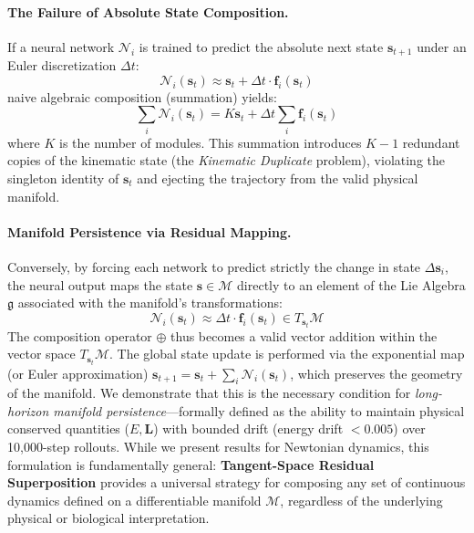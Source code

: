 \documentclass[twoside,11pt]{article}
\begin{document}
\paragraph{The Failure of Absolute State Composition.}
If a neural network $\mathcal{N}_i$ is trained to predict the absolute next state $\mathbf{s}_{t+1}$ under an Euler discretization $\Delta t$:
\begin{equation}
    \mathcal{N}_i(\mathbf{s}_t) \approx \mathbf{s}_t + \Delta t \cdot \mathbf{f}_i(\mathbf{s}_t)
\end{equation}
naive algebraic composition (summation) yields:
\begin{equation}
    \sum_{i} \mathcal{N}_i(\mathbf{s}_t) = K\mathbf{s}_t + \Delta t \sum_{i} \mathbf{f}_i(\mathbf{s}_t)
\end{equation}
where $K$ is the number of modules. This summation introduces $K-1$ redundant copies of the kinematic state (the \emph{Kinematic Duplicate} problem), violating the singleton identity of $\mathbf{s}_t$ and ejecting the trajectory from the valid physical manifold.

\paragraph{Manifold Persistence via Residual Mapping.}
Conversely, by forcing each network to predict strictly the change in state $\Delta \mathbf{s}_i$, the neural output maps the state $\mathbf{s} \in \mathcal{M}$ directly to an element of the Lie Algebra $\mathfrak{g}$ associated with the manifold's transformations:
\begin{equation}
    \mathcal{N}_i(\mathbf{s}_t) \approx \Delta t \cdot \mathbf{f}_i(\mathbf{s}_t) \in T_{\mathbf{s}_t}\mathcal{M}
\end{equation}
The composition operator $\oplus$ thus becomes a valid vector addition within the vector space $T_{\mathbf{s}_t}\mathcal{M}$. The global state update is performed via the exponential map (or Euler approximation) $\mathbf{s}_{t+1} = \mathbf{s}_t + \sum_{i} \mathcal{N}_i(\mathbf{s}_t)$, which preserves the geometry of the manifold. We demonstrate that this is the necessary condition for \emph{long-horizon manifold persistence}---formally defined as the ability to maintain physical conserved quantities ($E, \mathbf{L}$) with bounded drift (energy drift $< 0.005$) over 10,000-step rollouts. While we present results for Newtonian dynamics, this formulation is fundamentally general: \textbf{Tangent-Space Residual Superposition} provides a universal strategy for composing any set of continuous dynamics defined on a differentiable manifold $\mathcal{M}$, regardless of the underlying physical or biological interpretation.
\end{document}

